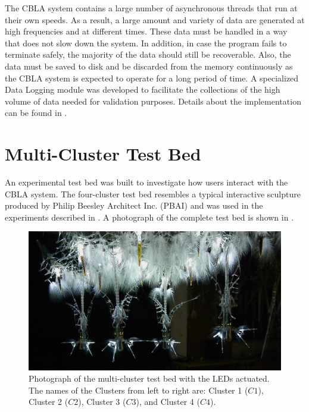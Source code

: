 The CBLA system contains a large number of asynchronous threads that run at their own speeds. As a result, a large amount and variety of data are generated at high frequencies and at different times. These data must be handled in a way that does not slow down the system. In addition, in case the program fails to terminate safely, the majority of the data should still be recoverable. Also, the data must be saved to disk and be discarded from the memory continuously as the CBLA system is expected to operate for a long period of time. A specialized Data Logging module was developed to facilitate the collections of the high volume of data needed for validation purposes. Details about the implementation can be found in .



\section{Multi-Cluster Test Bed}\label{sec:multi-cluster-test-bed}

An experimental test bed was built to investigate how users interact with the CBLA system. The four-cluster test bed resembles a typical interactive sculpture produced by Philip Beesley Architect Inc. (PBAI) and was used in the experiments described in . A photograph of the complete test bed is shown in .

\begin{figure} [!htb]
	\centering
	\includegraphics[width=1.0\textwidth]{"fig/validations/cbla-test-bed photo 2"}
	\caption[Photograph of the multi-cluster test bed]{Photograph of the multi-cluster test bed with the LEDs actuated. The names of the Clusters from left to right are: Cluster 1 ($C1$), Cluster 2 ($C2$), Cluster 3 ($C3$), and Cluster 4 ($C4$).}
	\label{fig:cbla-test-bed photo 2}
\end{figure}


